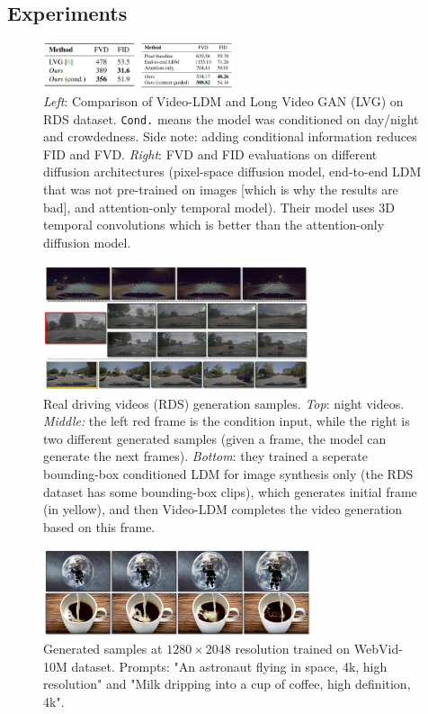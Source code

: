 \subsection{Experiments}

\begin{figure}
    \centering
    \includegraphics[width=0.5\textwidth]{images/video_ldm/videoldm_vs_lvg_on_rds.png}
    \caption{\textit{Left}: Comparison of Video-LDM and Long Video GAN (LVG) on RDS dataset. \texttt{Cond.} means the model was conditioned on day/night and crowdedness. Side note: adding conditional information reduces FID and FVD. \textit{Right}: FVD and FID evaluations on different diffusion architectures (pixel-space diffusion model, end-to-end LDM that was not pre-trained on images [which is why the results are bad], and attention-only temporal model). Their model uses 3D temporal convolutions which is better than the attention-only diffusion model.}
    \label{fig:video_ldm_vs_lvg_on_rds}
\end{figure}

\begin{figure}
    \centering
    \includegraphics[width=0.7\textwidth]{images/video_ldm/rds.png}
    \caption{Real driving videos (RDS) generation samples. \textit{Top}: night videos. \textit{Middle:} the left red frame is the condition input, while the right is two different generated samples (given a frame, the model can generate the next frames). \textit{Bottom}: they trained a seperate bounding-box conditioned LDM for image synthesis only (the RDS dataset has some bounding-box clips), which generates initial frame (in yellow), and then Video-LDM completes the video generation based on this frame.}
\end{figure}

\begin{figure}
    \centering
    \includegraphics[width=0.7\textwidth]{images/video_ldm/webvid_samples.png}
    \caption{Generated samples at $1280\times 2048$ resolution trained on WebVid-10M dataset. Prompts: "An astronaut flying in space, 4k, high resolution" and "Milk dripping into a cup of coffee, high definition, 4k".}
\end{figure}

